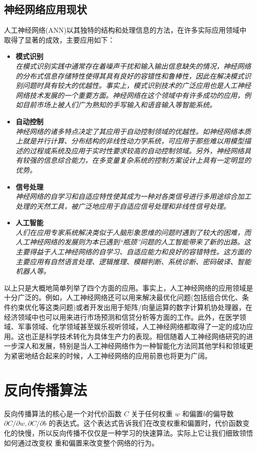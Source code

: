 \section{神经网络应用现状}
人工神经网络(ANN)以其独特的结构和处理信息的方法，在许多实际应用领域中取得了显著的成效，主要应用如下：
\begin{itemize}
\item \textbf{模式识别}\\
\textit{在模式识别实践中通常存在着噪声干扰和输入输出信息缺失的情况，神经网络的分布式信息存储特性使得其具有良好的容错性和鲁棒性，因此在解决模式识别问题时具有较大的优越性。事实上，模式识别技术的广泛应用也是人工神经网络技术发展的一个重要方面。神经网络在这个领域中有许多成功的应用，例如目前市场上被人们广为熟知的手写输入和语音输入等智能系统。}

\item \textbf{自动控制}\\
\textit{神经网络的诸多特点决定了其应用于自动控制领域的优越性。如神经网络本质上就是并行计算、分布结构的非线性动力学系统，可应用于那些难以用模型描述的过程或系统及应用于实时性要求较高的自动控制领域。另外，神经网络具有较强的信息综合能力，在多变量复杂系统的控制方案设计上具有一定明显的优势。}

\item \textbf{信号处理}\\
\textit{    神经网络的自学习和自适应特性使其成为一种对各类信号进行多用途综合加工处理的天然工具，被广泛地应用于自适应信号处理和非线性信号处理。
}

\item \textbf{人工智能}\\
\textit{人们在应用专家系统解决类似于人脑形象思维的问题时遇到了较大的困难，而人工神经网络的发展则为本已遇到“瓶颈”问题的人工智能带来了新的出路。这主要得益于人工神经网络的自学习、自适应能力和良好的容错特性。这方面的主要应用有自然语言处理、逻辑推理、模糊判断、系统诊断、密码破译、智能机器人等。
}
\end{itemize}

以上只是大概地简单列举了四个方面的应用。事实上，人工神经网络的应用领域是十分广泛的。例如，人工神经网络还可以用来解决最优化问题(包括组合优化、条件约束优化等这类问题)或者开发出用于矩阵/向量运算的数字计算机协处理器，在经济领域中也可以用来进行市场预测和信贷分析等方面的工作。此外，在医学领域、军事领域、化学领域甚至娱乐视听领域，人工神经网络都取得了一定的成功应用。这也正是科学技术转化为具体生产力的表现。相信随着人工神经网络研究的进一步深人和发展，特别是当人工神经网络作为一种智能化方法同其他学科和领域更为紧密地结合起来的时候，人工神经网络的应用前景也将更为广阔。

\chapter{反向传播算法}
反向传播算法的核心是一个对代价函数 $C$ 关于任何权重 $w$
和偏置$b$的偏导数 $\partial C/\partial w,\partial C/\partial b$ 的表达式。这个表达式告诉我们在改变权重和偏置时，代价函数变化的快慢，所以反向传播不仅仅是一种学习的快速算法。实际上它让我们细致领悟如何通过改变权
重和偏置来改变整个网络的行为。



